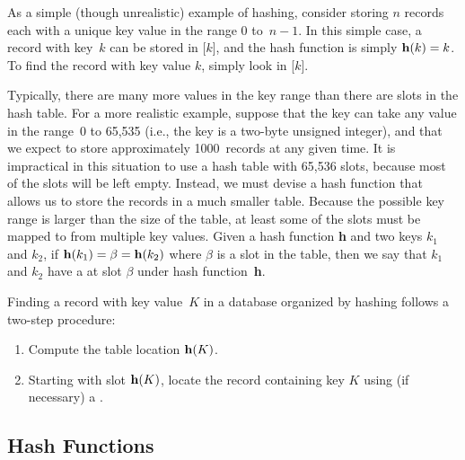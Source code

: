 As a simple (though unrealistic) example of hashing,
consider storing \(n\) records each with a
unique key value in the range 0 to~\(n-1\).
In this simple case, a record with key~\(k\) can be stored in
[\(k\)], and the hash function is simply
\({\bf h}(k) = k\).
To find the record with key value \(k\), simply look in [\(k\)].

Typically, there are many more values in the key range than there are
slots in the hash table.
For a more realistic example, suppose that the key can take any value
in the range~0 to 65,535 (i.e., the key is a two-byte unsigned
integer), and that we expect to store approximately 1000~records at
any given time.
It is impractical in this situation to use a hash table with
65,536 slots, because most of the slots will be left empty.
Instead, we must devise a hash function that allows us to store the
records in a much smaller table.
Because the possible key range is larger than the size of the table,
at least some of the slots must be mapped to from multiple key
values.
Given a hash function {\bf h} and two keys \(k_1\) and \(k_2\), if
\({\bf h}(k_1) = \beta = {\bf h}(k_2)\) where \(\beta\) is a slot in
the table, then we say that \(k_1\) and \(k_2\) have a
 at
slot \(\beta\) under hash function~{\bf h}.

Finding a record with key value~\(K\) in a database organized by hashing
follows a two-step procedure:

\begin{enumerate}

\item
Compute the table location \({\bf h}(K)\).

\item
Starting with slot \({\bf h}(K)\), locate the record containing key
\(K\) using (if necessary) a
.

\end{enumerate}

\subsection{Hash Functions}
\label{HashFun}


